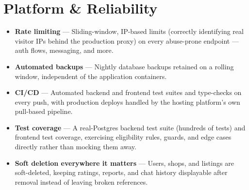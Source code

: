 \documentclass[11pt]{article}
\newcommand{\feature}[2]{%
  \item \textbf{#1} --- #2
}
\begin{document}
\section{Platform \& Reliability}
\begin{itemize}
  \feature{Rate limiting}{Sliding-window, IP-based limits (correctly identifying real visitor IPs behind the production proxy) on every abuse-prone endpoint --- auth flows, messaging, and more.}
  \feature{Automated backups}{Nightly database backups retained on a rolling window, independent of the application containers.}
  \feature{CI/CD}{Automated backend and frontend test suites and type-checks on every push, with production deploys handled by the hosting platform's own pull-based pipeline.}
  \feature{Test coverage}{A real-Postgres backend test suite (hundreds of tests) and frontend test coverage, exercising eligibility rules, guards, and edge cases directly rather than mocking them away.}
  \feature{Soft deletion everywhere it matters}{Users, shops, and listings are soft-deleted, keeping ratings, reports, and chat history displayable after removal instead of leaving broken references.}
\end{itemize}
\end{document}
